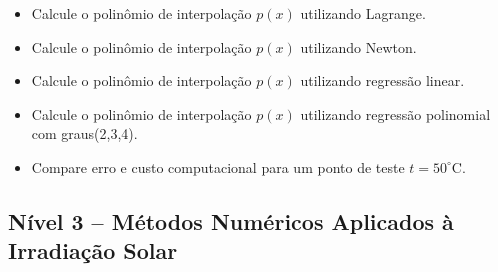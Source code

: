 \begin{enumerate}[label=\thesection.\arabic*]
\begin{itemize}
    \item Calcule o polinômio de interpolação $p(x)$ utilizando Lagrange.
    \item Calcule o polinômio de interpolação $p(x)$ utilizando Newton.   
    \item Calcule o polinômio de interpolação $p(x)$ utilizando regressão linear.
    \item Calcule o polinômio de interpolação $p(x)$ utilizando regressão polinomial com graus(2,3,4).
    \item Compare erro e custo computacional para um ponto de teste $t=50^{\circ}\mathrm{C}$.
\end{itemize}
	
\end{enumerate}

\subsection*{Nível 3 -- Métodos Numéricos Aplicados à Irradiação Solar}

